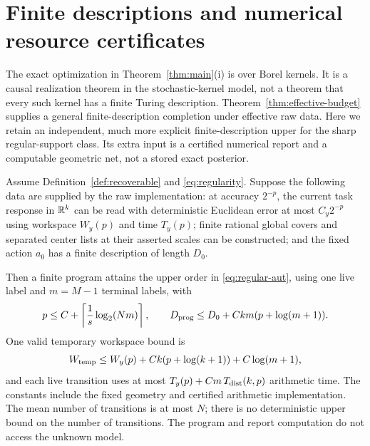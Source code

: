 \section{Finite descriptions and numerical resource certificates}\label{app:computation}
The exact optimization in Theorem~\ref{thm:main}(i) is over Borel kernels. It is a causal realization theorem in the stochastic-kernel model, not a theorem that every such kernel has a finite Turing description. Theorem~\ref{thm:effective-budget} supplies a general finite-description completion under effective raw data. Here we retain an independent, much more explicit finite-description upper for the sharp regular-support class. Its extra input is a certified numerical report and a computable geometric net, not a stored exact posterior.

\begin{proposition}\label{prop:finite-bit}
Assume Definition~\ref{def:recoverable} and \eqref{eq:regularity}. Suppose the following data are supplied by the raw implementation: at accuracy $2^{-p}$, the current task response in $\mathbb R^k$ can be read with deterministic Euclidean error at most $C_y2^{-p}$ using workspace $W_y(p)$ and time $T_y(p)$; finite rational global covers and separated center lists at their asserted scales can be constructed; and the fixed action $a_0$ has a finite description of length $D_0$.

Then a finite program attains the upper order in \eqref{eq:regular-aut}, using one live label and $m=M-1$ terminal labels, with
\begin{equation}\label{eq:precision-cost}
 p\le C+\left\lceil\frac1s\log_2(Nm)\right\rceil,
 \qquad D_{\rm prog}\le D_0+Ckm(p+\log(m+1)).
\end{equation}
One valid temporary workspace bound is
\begin{equation}\label{eq:workspace-cost}
 W_{\rm temp}\le W_y(p)+Ck(p+\log(k+1))+C\log(m+1),
\end{equation}
and each live transition uses at most $T_y(p)+Cm\,T_{\rm dist}(k,p)$ arithmetic time. The constants include the fixed geometry and certified arithmetic implementation. The mean number of transitions is at most $N$; there is no deterministic upper bound on the number of transitions. The program and report computation do not access the unknown model.
\end{proposition}
